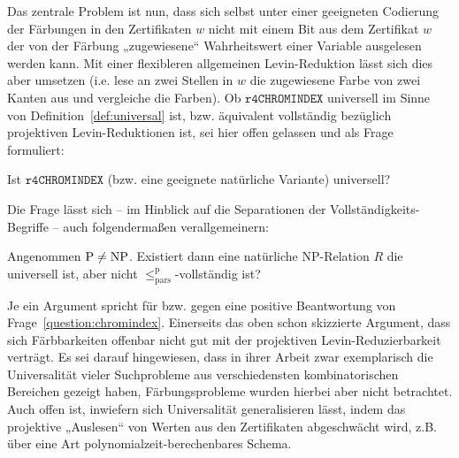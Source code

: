 Das zentrale Problem ist nun, dass sich selbst unter einer geeigneten Codierung der Färbungen in den Zertifikaten $w$ nicht mit einem Bit aus dem Zertifikat $w$ der von der Färbung „zugewiesene“ Wahrheitswert einer Variable ausgelesen werden kann. Mit einer flexibleren allgemeinen Levin-Reduktion lässt sich dies aber umsetzen (i.e. lese an zwei Stellen in $w$ die zugewiesene Farbe von zwei Kanten aus und vergleiche die Farben). Ob $\mathtt{r4CHROMINDEX}$ universell im Sinne von Definition~\ref{def:universal} ist, bzw. äquivalent vollständig bezüglich projektiven Levin-Reduktionen ist, sei hier offen gelassen und als Frage formuliert:
\begin{question}\label{question:chromindex}
    Ist $\mathtt{r4CHROMINDEX}$ (bzw. eine geeignete natürliche Variante) universell?
\end{question}
Die Frage lässt sich -- im Hinblick auf die Separationen der Vollständigkeits-Begriffe -- auch  folgendermaßen verallgemeinern:
\begin{question}
    Angenommen $\mathrm{P}\neq\mathrm{NP}$.
    Existiert dann eine natürliche NP-Relation $R$ die universell ist, aber nicht $\leq_\mathrm{pars}^\mathrm p$-vollständig ist?
\end{question}

Je ein Argument spricht für bzw. gegen eine positive Beantwortung von Frage~\ref{question:chromindex}.
Einerseits das oben schon skizzierte Argument, dass sich Färbbarkeiten offenbar nicht gut mit der projektiven Levin-Reduzierbarkeit verträgt.  Es sei darauf hingewiesen, dass \textcite{agrawal_universal_1992} in ihrer Arbeit zwar exemplarisch die Universalität vieler Suchprobleme aus verschiedensten kombinatorischen Bereichen gezeigt haben, Färbungsprobleme wurden hierbei aber nicht betrachtet. 
Auch offen ist, inwiefern sich Universalität generalisieren lässt, indem das projektive „Auslesen“ von Werten aus den Zertifikaten abgeschwächt wird, z.B. über eine Art polynomialzeit-berechenbares Schema.

